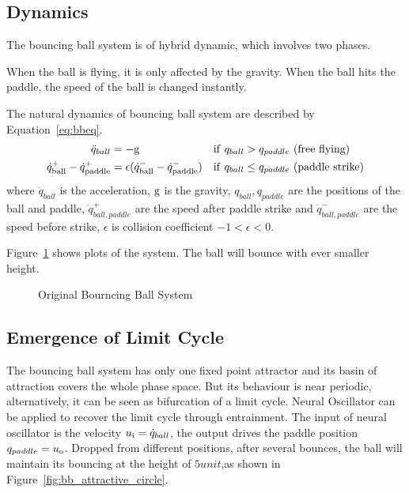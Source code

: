 \subsection*{Dynamics}
The bouncing ball system is of hybrid dynamic, which involves two phases.
\begin{itemize}
When the ball is flying, it is only affected by the gravity.
When the ball hits the paddle, the speed of the ball is changed instantly.
\end{itemize}
The natural dynamics of bouncing ball system are described by  Equation~\ref{eq:bbeq}.
\begin{align}
\ddot{q}_{ball}&=-\mathrm{g} &\mathrm{if}\,\,q_{ball} &> q_{paddle}\,\,\mathrm{(free\,\,flying)} \nonumber\\
\dot{q}^{+}_{\mathrm{ball}} - \dot{q}^{+}_{\mathrm{paddle}} &=  \epsilon(\dot{q}^{-}_{\mathrm{ball}} - \dot{q}^{-}_{\mathrm{paddle}})&\mathrm{if}\,\,q_{ball} &\leq {q_{paddle}}\,\,\mathrm{(paddle\,\,strike)}
\label{eq:bbeq}
\end{align}
where $\ddot{q}_{ball}$ is the acceleration,
$\mathrm{g}$ is the gravity,
$q_{ball},q_{paddle}$ are the positions of the ball and paddle,
$\dot{q}^{+}_{ball,paddle}$ are the speed after paddle strike and $\dot{q}^{-}_{ball,paddle}$ are the speed before strike,
$\epsilon$ is collision coefficient $-1 < \epsilon <0$.

Figure~\ref{fig:bborg} shows  plots of the system. 
The ball will bounce with ever smaller height. 




\begin{figure}[h]
\begin{center}
	
\end{center}
\caption{Original Bourncing Ball System}
\label{fig:bborg}
\end{figure}



\subsection*{Emergence of Limit Cycle}
The  bouncing ball system has only one fixed point attractor and its basin of attraction covers the whole phase space.
But its behaviour is near periodic, alternatively, it can be seen as bifurcation of a limit cycle.
Neural Oscillator can be applied to recover the limit cycle through entrainment.
The input of neural oscillator is the velocity $u_{\mathrm{i}}=\dot{q}_{ball}$, the output drives the paddle position $q_{paddle}=u_{\mathrm{o}}$.
Dropped from different positions, after several bounces, the ball will maintain its bouncing at the height of $5 unit$,as shown in Figure~\ref{fig:bb_attractive_circle}.

